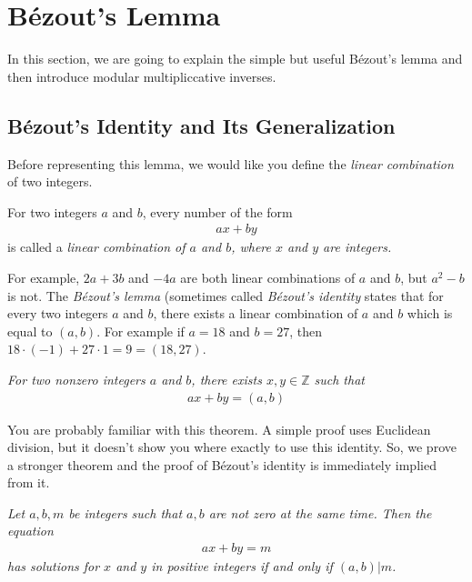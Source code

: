 \documentclass{subfile}
\begin{document}
	\section{B\'{e}zout's Lemma}
	
	In this section, we are going to explain the simple but useful B\'{e}zout's lemma and then introduce modular multipliccative inverses.
	
	\subsection{B\'{e}zout's Identity and Its Generalization}
	Before representing this lemma, we would like you define the \textit{linear combination} of two integers.
	
	\begin{definition}\label{def:linearcombination}
		For two integers $a$ and $b$, every number of the form
		\begin{align*} ax+by\end{align*}
		is called a \itshape{linear combination} of $a$ and $b$, where $x$ and $y$ are integers.
	\end{definition}
	
	For example, $2a+3b$ and $-4a$ are both linear combinations of $a$ and $b$, but $a^2-b$ is not. The \textit{B\'{e}zout's lemma} (sometimes called \textit{B\'{e}zout's identity} states that for every two integers $a$ and $b$, there exists a linear combination of $a$ and $b$ which is equal to $(a,b)$. For example if $a=18$ and $b=27$, then $18 \cdot (-1) + 27 \cdot 1 = 9 =(18,27)$.
	
	\begin{theorem}  \slshape
		For two nonzero integers $a$ and $b$, there exists $x, y \in \mathbb Z$ such that
		\begin{align*}
		ax+by = (a,b)
		\end{align*}
	\end{theorem}
	
	You are probably familiar with this theorem. A simple proof uses Euclidean division, but it doesn't show you where exactly to use this identity. So, we prove a stronger theorem and the proof of B\'{e}zout's identity is immediately implied from it.
	
	\begin{theorem}\slshape \label{thm:equationgcd}
		Let $a,b,m$ be integers such that $a, b$ are not zero at the same time. Then the equation
		\begin{align*} ax + by = m\end{align*}
		has solutions for $x$ and $y$ in positive integers if and only if $(a,b) | m$.
	\end{theorem}
	
\end{document}
